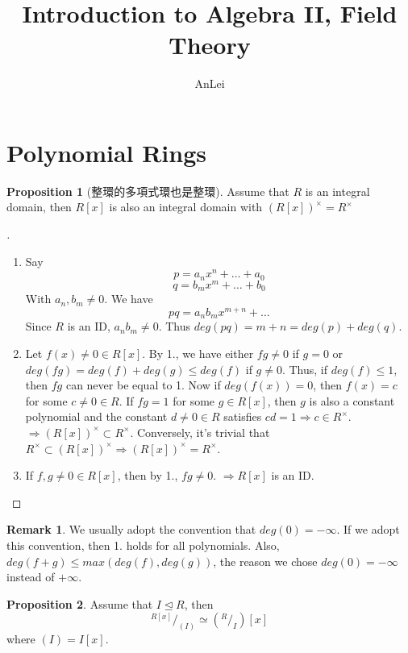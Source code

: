 \documentclass{article}
\title{Introduction to Algebra II, Field Theory}
\author{AnLei}
\date{ }
\theoremstyle{definition}
\newtheorem{rem}{Remark}
\newtheorem{prop}{Proposition}
\newenvironment{proofs}[1][\proofname]{%
  \begin{proof}[#1]$ $\par\nobreak\ignorespaces
}{%
  \end{proof}
}
\newcommand*\quot[2]{{^{\textstyle #1}\big/_{\textstyle #2}}}
\begin{document}
\maketitle
\tableofcontents

\section{Polynomial Rings}

\begin{prop}[整環的多項式環也是整環]
	Assume that $R$ is an integral domain, then $R[x]$ is also an integral domain with $(R[x])^\times=R^\times$
\end{prop}


\begin{proofs}
	\begin{enumerate}
	  \item Say 
		$$p = a_n x^n + \hdots + a_0$$
		$$q = b_m x^m + \hdots + b_0$$
		With $a_n, b_m \neq 0$. We have 
		$$pq = a_n b_m x^{m + n} + \hdots$$
		Since $R$ is an ID, $a_n b_m \neq 0$. Thus $deg(pq) = m + n  = deg(p) + deg(q)$. 
	  \item Let $f(x) \neq 0 \in R[x]$. By 1., we have either $fg \neq 0$ if $g = 0$ or $deg(fg) = deg(f) + deg(g) \leq deg(f)$ if $g \neq 0$. Thus, if $deg(f) \leq 1$, then $fg$ can never be equal to 1. Now if $deg(f(x)) = 0$, then $f(x) = c$ for some $c \neq 0 \in R$. If $fg = 1$ for some $g \in R[x]$, then $g$ is also a constant polynomial and the constant $d \neq 0 \in R$ satisfies $cd = 1 \Rightarrow c \in R^\times$. $\Rightarrow (R[x])^\times \subset R^\times$. Conversely, it's trivial that $R^\times \subset (R[x])^\times \Rightarrow (R[x])^\times = R^\times$.
	  \item If $f, g \neq 0 \in R[x]$, then by 1., $fg \neq 0$. $\Rightarrow R[x]$ is an ID. 
	\end{enumerate}
  \end{proofs}


\begin{rem}
	We usually adopt the convention that $deg(0) = - \infty$. If we adopt this convention, then 1. holds for all polynomials. Also, $deg(f + g) \leq max(deg(f), deg(g))$, the reason we chose $deg(0) = - \infty$ instead of $+ \infty$. 
  \end{rem}

  \begin{prop}
	Assume that $I \trianglelefteq R$, then 
	$$\quot{R[x]}{(I)} \simeq (\quot{R}{I})[x]$$
	where $(I) = I[x]$. 
  \end{prop}
\end{document}
